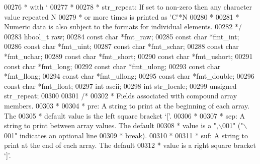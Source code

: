 \begin{DoxyCode}
{{{{{{{{{{{{00276 \textcolor{comment}{     *               with `%
00277 \textcolor{comment}{     *}
00278 \textcolor{comment}{     *   str\_repeat: If set to non-zero then any character value repeated N}
00279 \textcolor{comment}{     *               or more times is printed as 'C'*N}
00280 \textcolor{comment}{     *}
00281 \textcolor{comment}{     * Numeric data is also subject to the formats for individual elements.}
00282 \textcolor{comment}{     */}
00283     hbool\_t     raw;
00284     \textcolor{keyword}{const} \textcolor{keywordtype}{char}  *fmt\_raw;
00285     \textcolor{keyword}{const} \textcolor{keywordtype}{char}  *fmt\_int;
00286     \textcolor{keyword}{const} \textcolor{keywordtype}{char}  *fmt\_uint;
00287     \textcolor{keyword}{const} \textcolor{keywordtype}{char}  *fmt\_schar;
00288     \textcolor{keyword}{const} \textcolor{keywordtype}{char}  *fmt\_uchar;
00289     \textcolor{keyword}{const} \textcolor{keywordtype}{char}  *fmt\_short;
00290     \textcolor{keyword}{const} \textcolor{keywordtype}{char}  *fmt\_ushort;
00291     \textcolor{keyword}{const} \textcolor{keywordtype}{char}  *fmt\_long;
00292     \textcolor{keyword}{const} \textcolor{keywordtype}{char}  *fmt\_ulong;
00293     \textcolor{keyword}{const} \textcolor{keywordtype}{char}  *fmt\_llong;
00294     \textcolor{keyword}{const} \textcolor{keywordtype}{char}  *fmt\_ullong;
00295     \textcolor{keyword}{const} \textcolor{keywordtype}{char}  *fmt\_double;
00296     \textcolor{keyword}{const} \textcolor{keywordtype}{char}  *fmt\_float;
00297     \textcolor{keywordtype}{int}         ascii;
00298     \textcolor{keywordtype}{int}         str\_locale;
00299     \textcolor{keywordtype}{unsigned}    str\_repeat;
00300 
00301     \textcolor{comment}{/*}
00302 \textcolor{comment}{     * Fields associated with compound array members.}
00303 \textcolor{comment}{     *}
00304 \textcolor{comment}{     *   pre:       A string to print at the beginning of each array. The}
00305 \textcolor{comment}{     *              default value is the left square bracket `['.}
00306 \textcolor{comment}{     *}
00307 \textcolor{comment}{     *   sep:       A string to print between array values.  The default}
00308 \textcolor{comment}{     *              value is a ",\(\backslash\)001" ("\(\backslash\)001" indicates an optional line}
00309 \textcolor{comment}{     *              break).}
00310 \textcolor{comment}{     *}
00311 \textcolor{comment}{     *   suf:       A string to print at the end of each array.  The default}
00312 \textcolor{comment}{     *              value is a right square bracket `]'.}
}}}}}}}}}}}}}
\end{DoxyCode}
